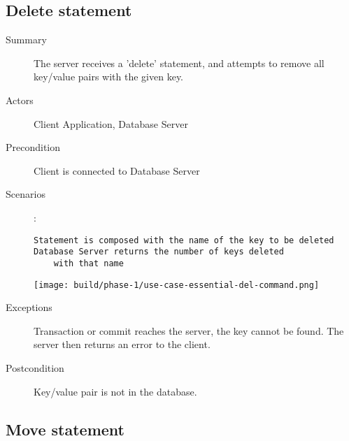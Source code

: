 \documentclass[a4paper]{report}
\begin{document}
	\pagebreak

	\subsection{Delete statement}

	\begin{description}
		\item[Summary] The server receives a 'delete' statement, and attempts to remove all key/value pairs with the given key.
		\item[Actors] Client Application, Database Server
		\item[Precondition] Client is connected to Database Server
		\item[Scenarios] :
		
		\begin{lstlisting}
Statement is composed with the name of the key to be deleted
Database Server returns the number of keys deleted
	with that name
		\end{lstlisting}

		\begin{center}
			\texttt{[image: build/phase-1/use-case-essential-del-command.png]}
		\end{center}

		\item[Exceptions] Transaction or commit reaches the server, the key cannot be found.  The server then returns an error to the client.
		\item[Postcondition] Key/value pair is not in the database.
	\end{description}
	
	\pagebreak

	\subsection{Move statement}
\end{document}
